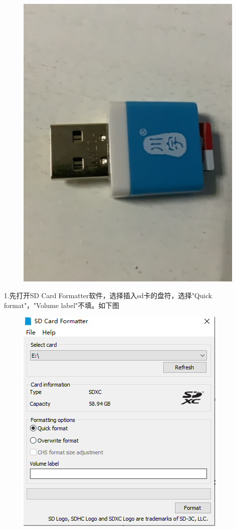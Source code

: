 \documentclass[openbib]{article}
\begin{document}
\begin{figure}[H]
	\centering
	\includegraphics[scale=0.2]{a9}
\end{figure}

1.先打开SD Card Formatter软件，选择插入sd卡的盘符，选择"Quick format"，"Volume label"不填。如下图

\begin{figure}[H]
	\centering
	\includegraphics[scale=0.4]{b3}
\end{figure}
\end{document}

